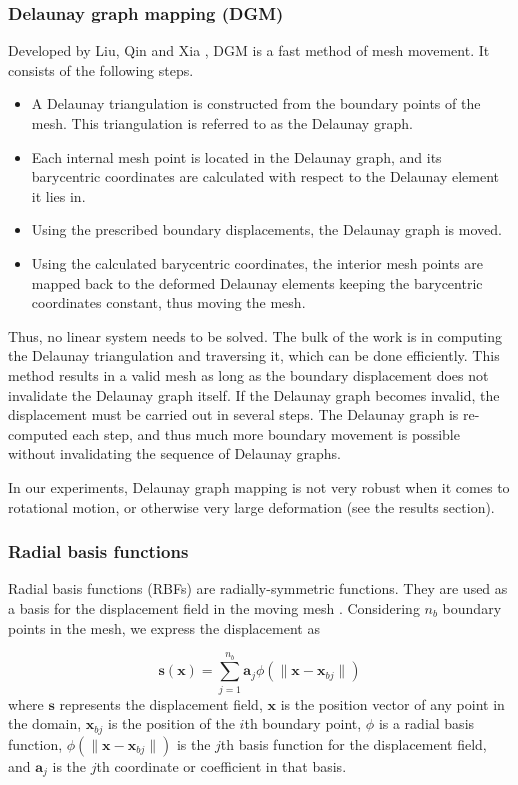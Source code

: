 \documentclass[11pt, ms, onehalfspacing]{ncsuthesis}
\begin{document}
\subsubsection{Delaunay graph mapping (DGM)}
Developed by Liu, Qin and Xia \cite{mm:dgm}, DGM is a fast method of mesh movement. It consists of the following steps.
\begin{itemize}
\item A Delaunay triangulation is constructed from the boundary points of the mesh. This triangulation is referred to as the Delaunay graph.
\item Each internal mesh point is located in the Delaunay graph, and its barycentric coordinates are calculated with respect to the Delaunay element it lies in.
\item Using the prescribed boundary displacements, the Delaunay graph is moved.
\item Using the calculated barycentric coordinates, the interior mesh points are mapped back to the deformed Delaunay elements keeping the barycentric coordinates constant, thus moving the mesh.
\end{itemize}
Thus, no linear system needs to be solved. The bulk of the work is in computing the Delaunay triangulation and traversing it, which can be done efficiently. This method results in a valid mesh as long as the boundary displacement does not invalidate the Delaunay graph itself. If the Delaunay graph becomes invalid, the displacement must be carried out in several steps. The Delaunay graph is re-computed each step, and thus much more boundary movement is possible without invalidating the sequence of Delaunay graphs.

In our experiments, Delaunay graph mapping is not very robust when it comes to rotational motion, or otherwise very large deformation (see the results section).

\subsubsection{Radial basis functions}

Radial basis functions (RBFs) are radially-symmetric functions. They are used as a basis for the displacement field in the moving mesh \cite{mm:rbf}. Considering $n_b$ boundary points in the mesh, we express the displacement as

\begin{equation}
\mathbf{s}(\mathbf{x}) = \sum_{j=1}^{n_b} \mathbf{a}_j \phi(\lVert\mathbf{x} - \mathbf{x}_{bj}\rVert)
\label{eqn:rbf}
\end{equation}
where $\mathbf{s}$ represents the displacement field, $\mathbf{x}$ is the position vector of any point in the domain, $\mathbf{x}_{bj}$ is the position of the $i$th boundary point, $\phi$ is a radial basis function, $\phi(\lVert\mathbf{x} - \mathbf{x}_{bj}\rVert)$ is the $j$th basis function for the displacement field, and $\mathbf{a}_j$ is the $j$th coordinate or coefficient in that basis.
\end{document}

